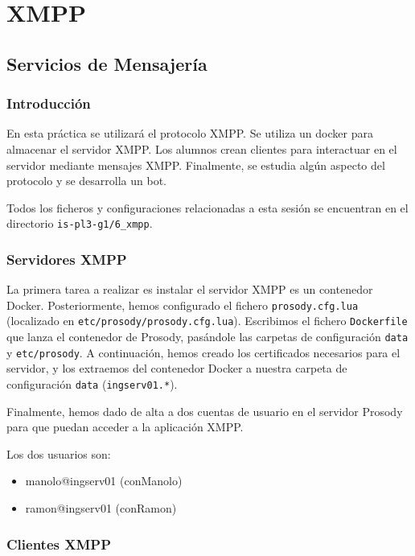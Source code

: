 \chapter{XMPP}\label{chap:6}
\section{Servicios de Mensajería}
\subsection{Introducción}

En esta práctica se utilizará el protocolo XMPP.
Se utiliza un docker para almacenar el servidor XMPP.
Los alumnos crean clientes para interactuar en el servidor mediante mensajes XMPP.
Finalmente, se estudia algún aspecto del protocolo y se desarrolla un bot.

\begin{notebox}
Todos los ficheros y configuraciones relacionadas a esta sesión se encuentran en el directorio
\lstinline{is-pl3-g1/6_xmpp}.
\end{notebox}

\subsection{Servidores XMPP}

La primera tarea a realizar es instalar el servidor XMPP es un contenedor Docker.
Posteriormente, hemos configurado el fichero \lstinline{prosody.cfg.lua} 
(localizado en \lstinline{etc/prosody/prosody.cfg.lua}).
Escribimos el fichero \lstinline{Dockerfile} que lanza el contenedor de Prosody,
pasándole las carpetas de configuración \lstinline{data} y \lstinline{etc/prosody}.
A continuación, hemos creado los certificados necesarios para el servidor, y los extraemos
del contenedor Docker a nuestra carpeta de configuración \lstinline{data} (\lstinline{ingserv01.*}).

Finalmente, hemos dado de alta a dos cuentas de usuario en el servidor Prosody
para que puedan acceder a la aplicación XMPP.

Los dos usuarios son:
\begin{itemize}[itemsep=0.10px]
    \item manolo@ingserv01 (conManolo)
    \item ramon@ingserv01 (conRamon)
\end{itemize}

\subsection{Clientes XMPP}

